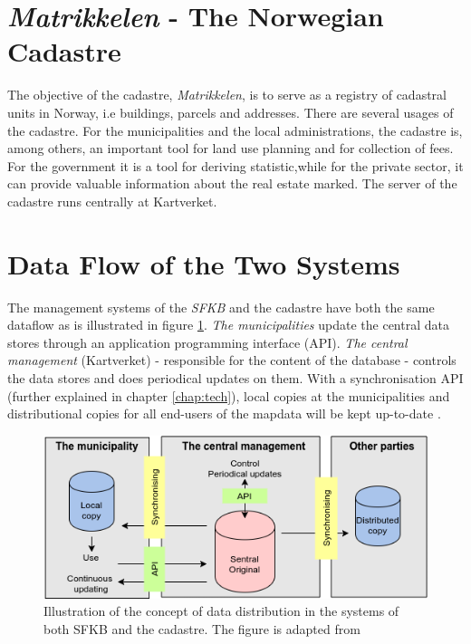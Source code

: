 
\section{\textit{Matrikkelen} - The Norwegian Cadastre}\label{cadastre}

The objective of the cadastre, \textit{Matrikkelen}, is to serve as a registry of cadastral units in Norway, i.e buildings, parcels and addresses. There are several usages of  the cadastre. For the municipalities and the local administrations, the cadastre is, among others, an important tool for land use planning and for collection of fees. For the government it is a tool for deriving statistic,while for the private sector, it can provide valuable information about the real estate marked\citep{Mjos2002}. The server of the cadastre runs centrally at Kartverket.  


\section{Data Flow of the Two Systems}
The management systems of the \textit{SFKB} and the cadastre have both the same dataflow as is illustrated in figure \ref{fig:konsept}. \textit{The municipalities}  update the central data stores through an application programming interface (API). \textit{The central management} (Kartverket) 	- responsible for the content of the database - controls the data stores and does periodical updates on them. With a synchronisation API (further explained in chapter \ref{chap:tech}), local copies at the municipalities and distributional copies for all end-users of the mapdata will be kept up-to-date \citep{Kartverket2015}.


\begin{figure}[H]
	\centering
	\includegraphics[scale=0.8]{img/consept.png}
	\caption{Illustration of the concept of data distribution in the systems of both SFKB and the cadastre. The figure is adapted from \cite{Kartverket2015} }
	\label{fig:konsept}
\end{figure}


